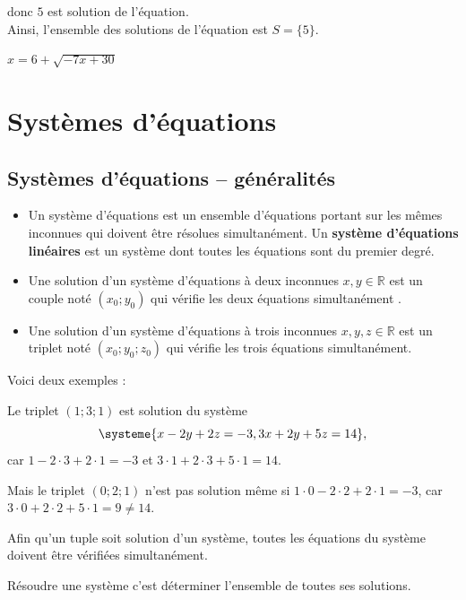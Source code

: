 \documentclass[a4paper,12pt]{article}
\begin{document}
      donc $5$ est solution de l'équation.\\
      Ainsi, l'ensemble des solutions de l'équation est $S=\{5\}$.

      \newpage

      \begin{exemple}
	      $x=6+\sqrt{-7x+30}$
	      \tcblower
\vspace{20cm}
\end{exemple}


\newpage
\section{Systèmes d'équations}

\subsection{Systèmes d'équations -- généralités}
	\begin{itemize}
		\item Un système d'équations est un ensemble d'équations portant sur les mêmes inconnues qui doivent être résolues simultanément. Un {\bfseries système d'équations linéaires} est un système dont toutes les équations sont du premier degré.
		\item Une solution d'un système d'équations à deux inconnues $x,y\in \mathbb{R}$ est un couple noté $(x_0 ; y_0)$ qui vérifie les deux équations simultanément .
\item Une solution d'un système d'équations à trois inconnues $x , y , z\in \mathbb{R}$ est un triplet noté $(x_0 ; y_0 ; z_0)$ qui vérifie les trois équations simultanément.
	\end{itemize}

Voici deux exemples : 

Le triplet $(1;3;1)$ est solution du système
\[\systeme{
  x - 2y + 2z = -3,
  3x + 2y + 5z = 14
},\] car $1-2\cdot 3+2\cdot 1=-3$ et $3\cdot 1+2\cdot 3+5\cdot 1 =14$.

Mais le triplet $(0;2;1)$ n'est pas solution même si $1\cdot 0-2\cdot 2+2\cdot 1=-3$, car $3\cdot 0+2\cdot 2+5\cdot 1=9\neq 14$. 

\begin{remarque}
	\tcblower
Afin qu'un tuple soit solution d'un système, toutes les équations du système doivent être vérifiées simultanément.  
\end{remarque}

Résoudre une système c'est déterminer l'ensemble de toutes ses solutions. 
\end{document}
